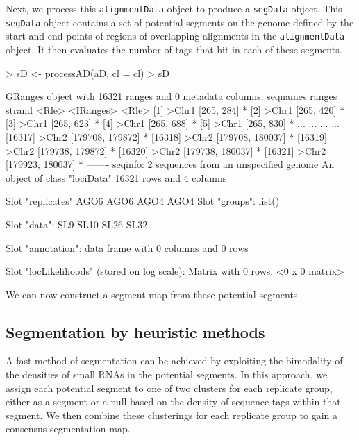 \documentclass[a4paper]{article}
\begin{document}
Next, we process this \verb'alignmentData' object to produce a \verb'segData' object. This \verb'segData' object contains a set of potential segments on the genome defined by the start and end points of regions of overlapping alignments in the \verb'alignmentData' object. It then evaluates the number of tags that hit in each of these segments.

\begin{Schunk}
\begin{Sinput}
> sD <- processAD(aD, cl = cl)
> sD
\end{Sinput}
\begin{Soutput}
GRanges object with 16321 ranges and 0 metadata columns:
          seqnames           ranges strand
             <Rle>        <IRanges>  <Rle>
      [1]    >Chr1       [265, 284]      *
      [2]    >Chr1       [265, 420]      *
      [3]    >Chr1       [265, 623]      *
      [4]    >Chr1       [265, 688]      *
      [5]    >Chr1       [265, 830]      *
      ...      ...              ...    ...
  [16317]    >Chr2 [179708, 179872]      *
  [16318]    >Chr2 [179708, 180037]      *
  [16319]    >Chr2 [179738, 179872]      *
  [16320]    >Chr2 [179738, 180037]      *
  [16321]    >Chr2 [179923, 180037]      *
  -------
  seqinfo: 2 sequences from an unspecified genome
An object of class "lociData"
16321 rows and 4 columns

Slot "replicates"
AGO6 AGO6 AGO4 AGO4
Slot "groups":
list()

Slot "data":
     SL9 SL10 SL26 SL32

Slot "annotation":
data frame with 0 columns and 0 rows

Slot "locLikelihoods" (stored on log scale):
Matrix with  0  rows.
<0 x 0 matrix>
\end{Soutput}
\end{Schunk}



We can now construct a segment map from these potential segments.

\subsection*{Segmentation by heuristic methods}

A fast method of segmentation can be achieved by exploiting the bimodality of the densities of small RNAs in the potential segments. In this approach, we assign each potential segment to one of two clusters for each replicate group, either as a segment or a null based on the density of sequence tags within that segment. We then combine these clusterings for each replicate group to gain a consensus segmentation map.
\end{document}
